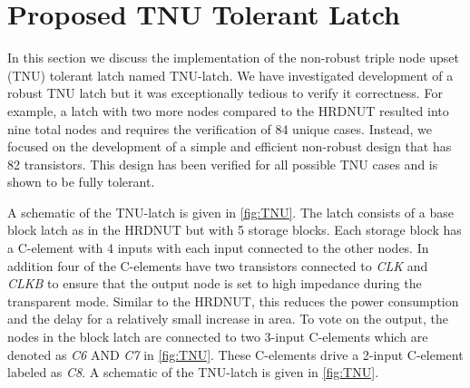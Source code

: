 \section{Proposed TNU Tolerant Latch} \label{sec:TNU}

In this section we discuss the implementation of the non-robust triple node upset (TNU) tolerant latch named TNU-latch. We have investigated development of a robust TNU latch but it was exceptionally tedious to verify it correctness. For example, a latch with two more nodes compared to the HRDNUT resulted into nine total nodes and requires the verification of 84 unique cases. Instead, we focused on the development of a simple and efficient non-robust design that has 82 transistors. This design has been verified for all possible TNU cases and is shown to be fully tolerant. 

A schematic of the TNU-latch is given in \ref{fig:TNU}. The latch consists of a base block latch as in the HRDNUT but with 5 storage blocks. Each storage block has a C-element with 4 inputs with each input connected to the other nodes. In addition four of the C-elements have two transistors connected to \textit{CLK} and \textit{CLKB} to ensure that the output node is set to high impedance during the transparent mode. Similar to the HRDNUT, this reduces the power consumption and the delay for a relatively small increase in area. To vote on the output, the nodes in the block latch are connected to two 3-input C-elements which are denoted as \textit{C6} AND \textit{C7} in \ref{fig:TNU}. These C-elements drive a 2-input C-element labeled as \textit{C8}. A schematic of the TNU-latch is given in \ref{fig:TNU}.

